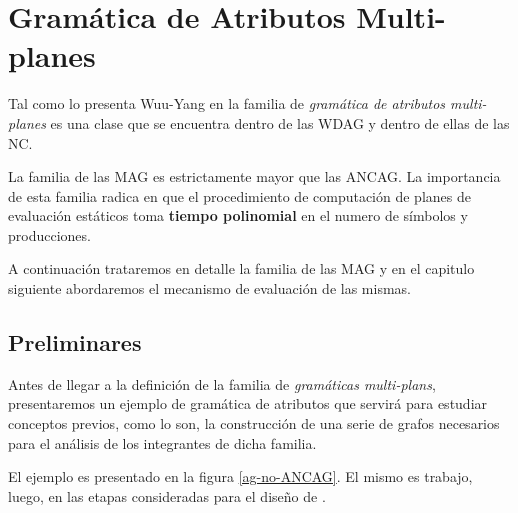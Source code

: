 \chapter{Gramática de Atributos Multi-planes}
\label{chap:mag}
\minitoc

Tal como lo presenta Wuu-Yang en \cite{wuu-yang1} la familia de \textit{gramática de atributos multi-planes} es una clase que se encuentra dentro de las WDAG y dentro de ellas de las NC.

La familia de las MAG es estrictamente mayor que las ANCAG. La importancia de esta familia radica en que el procedimiento de computación de planes de evaluación estáticos toma \textbf{tiempo polinomial} en el numero de símbolos y producciones.

A continuación trataremos en detalle la familia de las MAG y en el capitulo siguiente abordaremos el mecanismo de evaluación de las mismas.


\section{Preliminares}
\label{sec:pre-grafos}
Antes de llegar a la definición de la familia de \textit{gramáticas multi-plans}, presentaremos un ejemplo de gramática de atributos que servirá para estudiar conceptos previos, como lo son, la construcción de una serie de grafos necesarios para el análisis de los integrantes de dicha familia.

El ejemplo es presentado en la figura \ref{ag-no-ANCAG}. El mismo es trabajo, luego, en las etapas consideradas para el diseño de \maggen.


